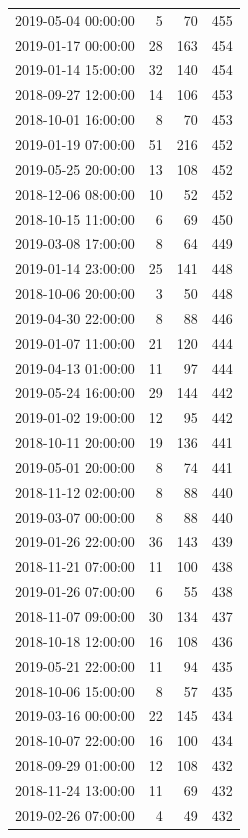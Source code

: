 \begin{tabular}{lrrr}
2019-05-04 00:00:00 & 5 & 70 & 455 \\
2019-01-17 00:00:00 & 28 & 163 & 454 \\
2019-01-14 15:00:00 & 32 & 140 & 454 \\
2018-09-27 12:00:00 & 14 & 106 & 453 \\
2018-10-01 16:00:00 & 8 & 70 & 453 \\
2019-01-19 07:00:00 & 51 & 216 & 452 \\
2019-05-25 20:00:00 & 13 & 108 & 452 \\
2018-12-06 08:00:00 & 10 & 52 & 452 \\
2018-10-15 11:00:00 & 6 & 69 & 450 \\
2019-03-08 17:00:00 & 8 & 64 & 449 \\
2019-01-14 23:00:00 & 25 & 141 & 448 \\
2018-10-06 20:00:00 & 3 & 50 & 448 \\
2019-04-30 22:00:00 & 8 & 88 & 446 \\
2019-01-07 11:00:00 & 21 & 120 & 444 \\
2019-04-13 01:00:00 & 11 & 97 & 444 \\
2019-05-24 16:00:00 & 29 & 144 & 442 \\
2019-01-02 19:00:00 & 12 & 95 & 442 \\
2018-10-11 20:00:00 & 19 & 136 & 441 \\
2019-05-01 20:00:00 & 8 & 74 & 441 \\
2018-11-12 02:00:00 & 8 & 88 & 440 \\
2019-03-07 00:00:00 & 8 & 88 & 440 \\
2019-01-26 22:00:00 & 36 & 143 & 439 \\
2018-11-21 07:00:00 & 11 & 100 & 438 \\
2019-01-26 07:00:00 & 6 & 55 & 438 \\
2018-11-07 09:00:00 & 30 & 134 & 437 \\
2018-10-18 12:00:00 & 16 & 108 & 436 \\
2019-05-21 22:00:00 & 11 & 94 & 435 \\
2018-10-06 15:00:00 & 8 & 57 & 435 \\
2019-03-16 00:00:00 & 22 & 145 & 434 \\
2018-10-07 22:00:00 & 16 & 100 & 434 \\
2018-09-29 01:00:00 & 12 & 108 & 432 \\
2018-11-24 13:00:00 & 11 & 69 & 432 \\
2019-02-26 07:00:00 & 4 & 49 & 432 \\

\end{tabular}
